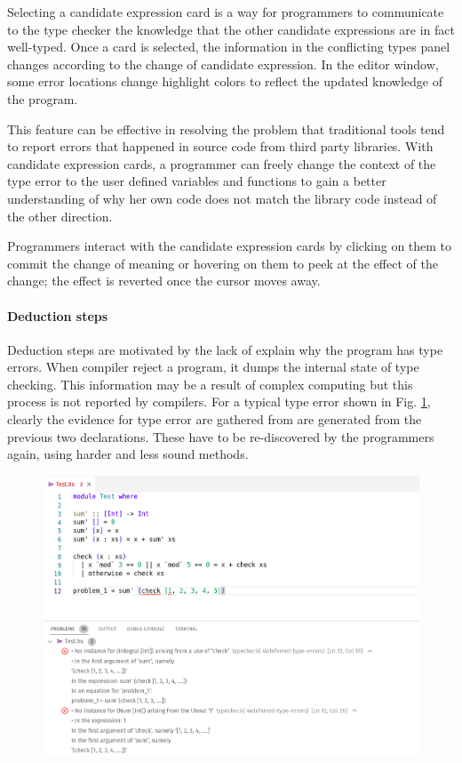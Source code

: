 Selecting a candidate expression card is a way for programmers to communicate to the type checker the knowledge that the other candidate expressions are in fact well-typed. Once a card is selected, the information in the conflicting types panel changes according to the change of candidate expression. In the editor window, some error locations change highlight colors to reflect the updated knowledge of the program. 


This feature can be effective in resolving the problem that traditional tools tend to report errors that happened in source code from third party libraries. With candidate expression cards, a programmer can freely change the context of the type error to the user defined variables and functions to gain a better understanding of why her own code does not match the library code instead of the other direction.


Programmers interact with the candidate expression cards by clicking on them to commit the change of meaning or hovering on them to peek at the effect of the change; the effect is reverted once the cursor moves away.


\paragraph{Deduction steps}  \label{sub:deduction-steps}

Deduction steps are motivated by the lack of explain why the program has  type errors. When compiler reject a program, it dumps the internal state of type checking.  This information may be a result of complex computing but this process is not reported by compilers. For a typical type error shown in Fig. \ref{fig:ghc-error-example}, clearly the evidence for type error are gathered from are generated from the previous two declarations. These have to be re-discovered by the programmers again, using harder and less sound methods. 

\begin{figure}[h]
    \centering
    \includegraphics[width=\linewidth]{images/ghc-error-example.png}
    \caption{
        }
    \label{fig:ghc-error-example}
\end{figure}

